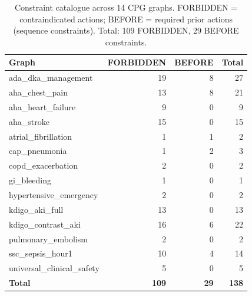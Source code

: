 \begin{table}[t]
\centering
\caption{Constraint catalogue across 14 CPG graphs.
  FORBIDDEN = contraindicated actions; BEFORE = required prior actions
  (sequence constraints). Total: 109 FORBIDDEN, 29 BEFORE constraints.}
\label{tab:c3_c5_constraints}
\small
\begin{tabular}{@{}lrrr@{}}
\toprule
Graph & FORBIDDEN & BEFORE & Total \\
\midrule
        ada\_dka\_management & 19 & 8 & 27 \\
        aha\_chest\_pain & 13 & 8 & 21 \\
        aha\_heart\_failure & 9 & 0 & 9 \\
        aha\_stroke & 15 & 0 & 15 \\
        atrial\_fibrillation & 1 & 1 & 2 \\
        cap\_pneumonia & 1 & 2 & 3 \\
        copd\_exacerbation & 2 & 0 & 2 \\
        gi\_bleeding & 1 & 0 & 1 \\
        hypertensive\_emergency & 2 & 0 & 2 \\
        kdigo\_aki\_full & 13 & 0 & 13 \\
        kdigo\_contrast\_aki & 16 & 6 & 22 \\
        pulmonary\_embolism & 2 & 0 & 2 \\
        ssc\_sepsis\_hour1 & 10 & 4 & 14 \\
        universal\_clinical\_safety & 5 & 0 & 5 \\
\midrule
        \textbf{Total} & \textbf{109} & \textbf{29} & \textbf{138} \\
\bottomrule
\end{tabular}
\end{table}
